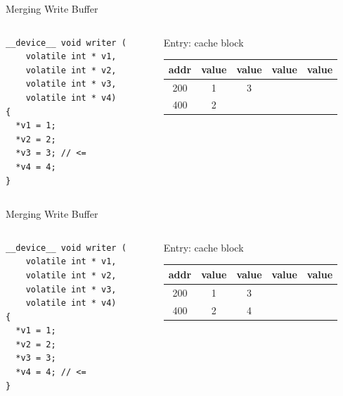 \documentclass[aspectratio=169,compress]{beamer}
\begin{document}
\begin{frame}[fragile]{Merging Write Buffer}{}
\centering
\begin{columns}[T]
	\begin{column}{0.4\textwidth}
\begin{lstlisting}[]
__device__ void writer (
    volatile int * v1,
    volatile int * v2,
    volatile int * v3,
    volatile int * v4)
{          
  *v1 = 1;
  *v2 = 2;
  *v3 = 3; // <= 
  *v4 = 4;
}
\end{lstlisting}
\end{column}
\begin{column}{0.5\textwidth}
	\centering
	Entry: cache block
	\begin{table}
		\begin{tabular}{| c | c | c | c | c |}
			\hline 
			addr & value & value & value & value  \\
			\hline 
			200 & 1 & 3 & & \\
			\hline 
			400 & 2 & & & \\
			\hline 
		\end{tabular}
	\end{table}
\end{column}
\end{columns}
\end{frame}


\begin{frame}[fragile]{Merging Write Buffer}{}
\centering
\begin{columns}[T]
	\begin{column}{0.4\textwidth}
\begin{lstlisting}[]
__device__ void writer (
    volatile int * v1,
    volatile int * v2,
    volatile int * v3,
    volatile int * v4)
{          
  *v1 = 1;
  *v2 = 2;
  *v3 = 3;
  *v4 = 4; // <= 
}
\end{lstlisting}
\end{column}
\begin{column}{0.5\textwidth}
	\centering
	Entry: cache block
	\begin{table}
		\begin{tabular}{| c | c | c | c | c |}
			\hline 
			addr & value & value & value & value  \\
			\hline 
			200 & 1 & 3 & & \\
			\hline 
			400 & 2 & 4 & & \\
			\hline 
		\end{tabular}
	\end{table}
\end{column}
\end{columns}
\end{frame}
\end{document}
